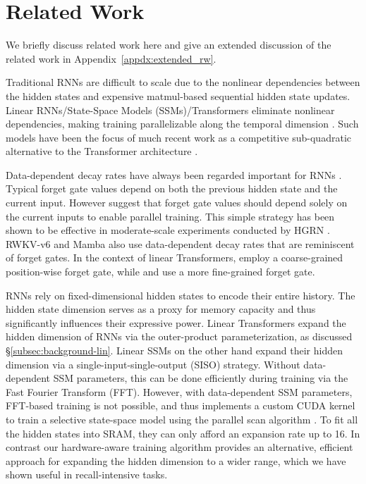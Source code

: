 \vspace{-2mm}
\section{Related Work}
\label{sec:related}
\vspace{-2mm}
We briefly discuss related work here and give an extended discussion of the related work in Appendix~\ref{appdx:extended_rw}.
%

Traditional RNNs are difficult to scale  due to the nonlinear dependencies between the  hidden states and expensive matmul-based sequential hidden state updates. Linear RNNs/State-Space Models (SSMs)/Transformers eliminate nonlinear dependencies, making training parallelizable along the temporal dimension \citep{parallel-martin, s4, s5}. Such models have been the focus of much recent work as a competitive sub-quadratic alternative to the Transformer architecture \citep{rwkv, Gu2023MambaLS,HGRN,qin2023scaling,sun2023retentive,pretrain_wo_attn}.







Data-dependent decay rates have always been regarded important for  RNNs  \citep{DBLP:journals/neco/GersSC00,unreasonable-forget-gate}. Typical forget gate values depend on both the previous hidden state and the current input. However \citet{parallel-martin} suggest that forget gate values should depend solely on the current inputs to enable parallel training. This simple strategy has been shown to be effective in moderate-scale experiments conducted by HGRN \citep{qin2023scaling}.  RWKV-v6 \citep{peng2024eagle} and Mamba \citep{Gu2023MambaLS} also use data-dependent decay rates that are reminiscent of forget gates. In the context of linear Transformers, \citet{peng2021random} employ a coarse-grained position-wise forget gate, while \citet{mao-2022-fine} and \citet{gatedloop} use a more fine-grained forget gate. 
%

RNNs rely on fixed-dimensional hidden states to encode their entire history. The hidden state dimension  serves as a proxy for memory capacity and thus significantly influences their expressive power. 
Linear Transformers expand the hidden dimension of RNNs via the outer-product parameterization, as discussed \S\ref{subsec:background-lin}. Linear SSMs on the other hand expand their hidden dimension via a single-input-single-output (SISO) strategy. 
Without data-dependent SSM parameters, this can be done efficiently during training via the Fast Fourier Transform (FFT). However, with data-dependent SSM parameters, FFT-based training is not possible, and thus \citet{Gu2023MambaLS} implements a custom CUDA kernel to train a selective state-space model using the parallel scan algorithm \citep{s5}. To fit all the hidden states into SRAM, they can only afford an expansion rate up to 16. In contrast our hardware-aware training algorithm provides an alternative, efficient approach for expanding the hidden dimension to a wider range, which we have shown useful in recall-intensive tasks.


\vspace{-2mm}
%
%





